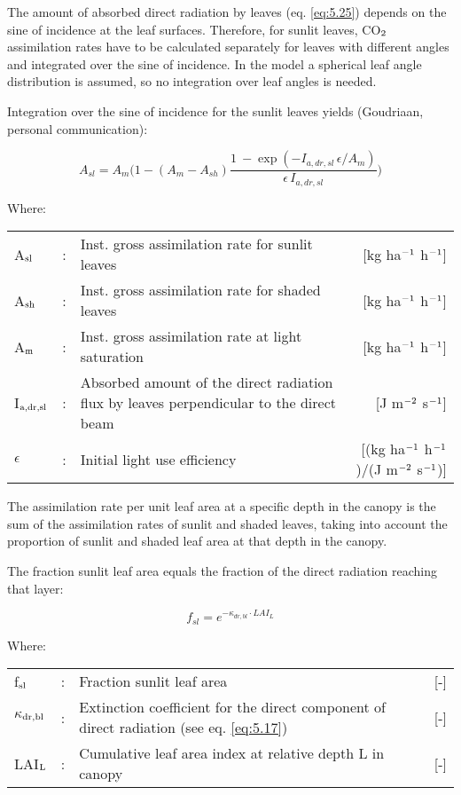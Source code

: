 The amount of absorbed direct radiation by leaves (eq. \ref{eq:5.25}) depends on the sine of
incidence at the leaf surfaces. Therefore, for sunlit leaves, CO$_{{\rm 2}}$ assimilation rates have to
be calculated separately for leaves with different angles and integrated over the sine of
incidence. In the model a spherical leaf angle distribution is assumed, so no integration
over leaf angles is needed.

Integration over the sine of incidence for the sunlit leaves yields (Goudriaan, personal
communication):

\begin{equation}
A_{sl} = A_{m} \bigg( 
1-(A_{m} - A_{sh})  {\frac{1~- \exp({{-I _{a,dr,sl} \, \epsilon}}/{A_m}) }
	{\epsilon\, I _{a,dr,sl} }}
\bigg)
\end{equation}

Where:\\[5pt]
\begin{tabularx}{\textwidth}{llXr}
	A$_{{\rm sl}}$ &:& Inst. gross assimilation rate for sunlit leaves  &
	[kg ha$^{{\rm -1}}$ h$^{{\rm -1}}$]\\
	A$_{{\rm sh}}$ &:& Inst. gross assimilation rate for shaded leaves  &
	[kg ha$^{{\rm -1}}$ h$^{{\rm -1}}$]\\
	A$_{{\rm m}}$ &:& Inst. gross assimilation rate at light saturation &
	[kg ha$^{{\rm -1}}$ h$^{{\rm -1}}$]\\
	I$_{{\rm a,dr,sl}}$ &:& Absorbed amount of the direct radiation flux by leaves
	perpendicular to the direct beam  &  [J m$^{{\rm -2}}$ s$^{{\rm -1}}$]\\
	$\epsilon$ &:& Initial light use efficiency  &   [(kg ha$^{{\rm -1}}$ 
	h$^{{\rm -1}}$)/(J m$^{{\rm -2}}$ s$^{{\rm -1}}$)]\\
\end{tabularx}

The assimilation rate per unit leaf area at a specific depth in the canopy is the sum of the
assimilation rates of sunlit and shaded leaves, taking into account the proportion of sunlit
and shaded leaf area at that depth in the canopy. 

The fraction sunlit leaf area equals the fraction of the direct radiation reaching that layer:

\begin{equation}
f_{sl} =  e^{-\kappa_{dr,bl} \cdot LAI_{L}}
\end{equation}

Where:\\[5pt]
\begin{tabularx}{\textwidth}{llXr}
	f$_{{\rm sl}}$ &:& Fraction sunlit leaf area   &     [-]\\
	$\kappa$$_{{\rm dr,bl}}$ &:& Extinction coefficient for the direct component of
	direct radiation (see eq. \ref{eq:5.17})   &     [-]\\
	LAI$_{{\rm L}}$ &:& Cumulative leaf area index at relative depth L in canopy  &      [-]
\end{tabularx}

